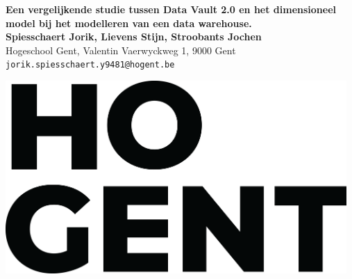 \documentclass[a0,portrait]{a0poster}
\begin{document}


\begin{minipage}[t]{0.75\linewidth}
\VeryHuge \color{HoGentAccent1} \textbf{Een vergelijkende studie tussen Data Vault 2.0 en het dimensioneel model bij het modelleren van een data warehouse.} \color{Black}\\ %
\huge \textbf{Spiesschaert Jorik, Lievens Stijn, Stroobants Jochen}\\[0.5cm] %
\huge Hogeschool Gent, Valentin Vaerwyckweg 1, 9000 Gent\\[0.4cm] %
\Large \texttt{jorik.spiesschaert.y9481@hogent.be} \\
\end{minipage}
%
\begin{minipage}[t]{0.25\linewidth}
\includegraphics[width=13cm,right]{figures/HG-woordmerk.png} 

\end{minipage}

\vspace{1cm} %

\end{document}
